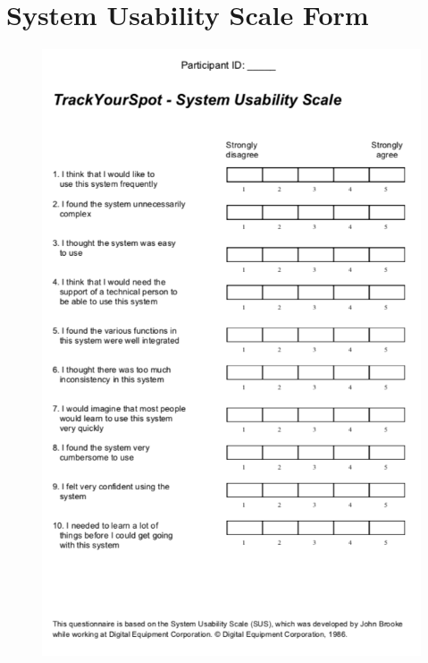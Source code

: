 \chapter{System Usability Scale Form}
\newpage
\begin{figure}[H]
    \includegraphics[width=1\textwidth, center]{figures/susscale.png}
\end{figure}


